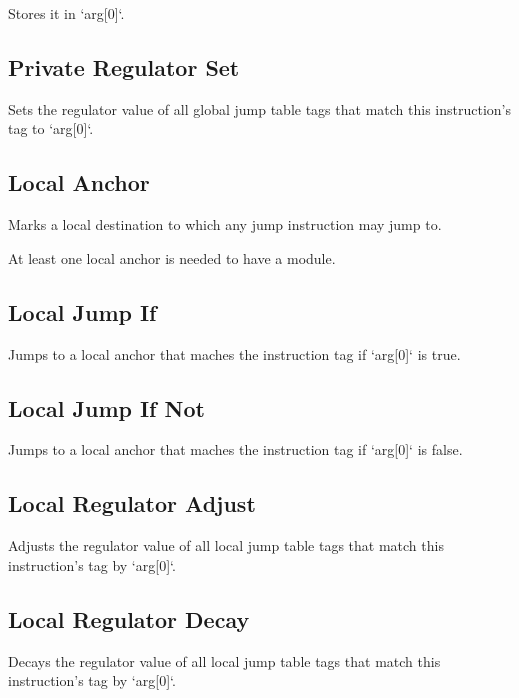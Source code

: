 Stores it in `arg[0]`.

\subsection{Private Regulator Set}


Sets the regulator value of all global jump table tags that match this instruction's tag to `arg[0]`.

\subsection{Local Anchor}


Marks a local destination to which any jump instruction may jump to.

At least one local anchor is needed to have a module.

\subsection{Local Jump If}


Jumps to a local anchor that maches the instruction tag if `arg[0]` is true.

\subsection{Local Jump If Not}


Jumps to a local anchor that maches the instruction tag if `arg[0]` is false.

\subsection{Local Regulator Adjust}


Adjusts the regulator value of all local jump table tags that match this instruction's tag by `arg[0]`.

\subsection{Local Regulator Decay}


Decays the regulator value of all local jump table tags that match this instruction's tag by `arg[0]`.


